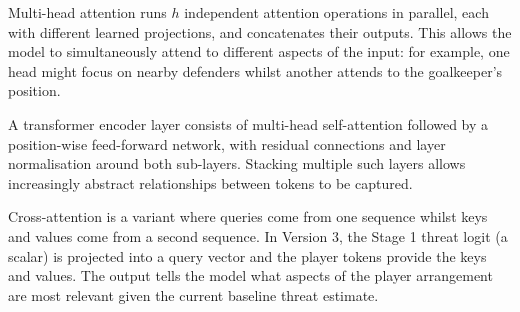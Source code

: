Multi-head attention runs $h$ independent attention operations in parallel, each with different learned projections, and concatenates their outputs. This allows the model to simultaneously attend to different aspects of the input: for example, one head might focus on nearby defenders whilst another attends to the goalkeeper's position.

A transformer encoder layer consists of multi-head self-attention followed by a position-wise feed-forward network, with residual connections and layer normalisation around both sub-layers. Stacking multiple such layers allows increasingly abstract relationships between tokens to be captured.

Cross-attention is a variant where queries come from one sequence whilst keys and values come from a second sequence. In Version 3, the Stage 1 threat logit (a scalar) is projected into a query vector and the player tokens provide the keys and values. The output tells the model what aspects of the player arrangement are most relevant given the current baseline threat estimate.

